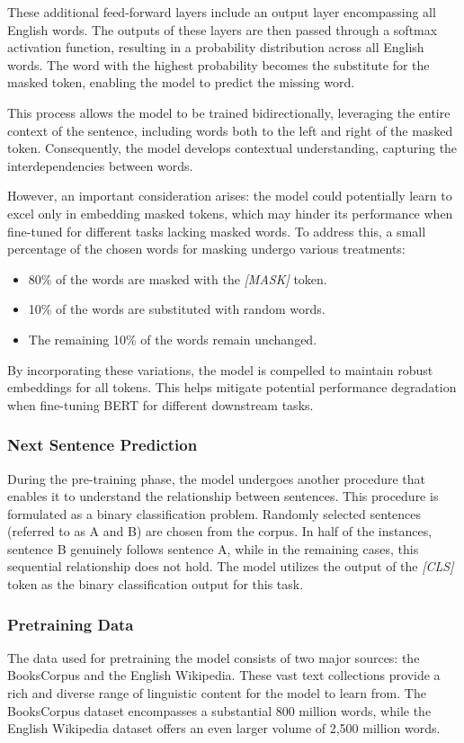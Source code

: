 \documentclass[a4paper,12pt]{report} %
\begin{document}
These additional feed-forward layers include an output layer encompassing all English words. The outputs of these layers are then passed through a softmax activation function, resulting in a probability distribution across all English words. The word with the highest probability becomes the substitute for the masked token, enabling the model to predict the missing word.

This process allows the model to be trained bidirectionally, leveraging the entire context of the sentence, including words both to the left and right of the masked token. Consequently, the model develops contextual understanding, capturing the interdependencies between words.

However, an important consideration arises: the model could potentially learn to excel only in embedding masked tokens, which may hinder its performance when fine-tuned for different tasks lacking masked words. To address this, a small percentage of the chosen words for masking undergo various treatments:

\begin{itemize}
  \item 80\% of the words are masked with the \textit{[MASK]} token.
  \item 10\% of the words are substituted with random words.
  \item The remaining 10\% of the words remain unchanged.
\end{itemize}

By incorporating these variations, the model is compelled to maintain robust embeddings for all tokens. This helps mitigate potential performance degradation when fine-tuning BERT for different downstream tasks.

\subsubsection{Next Sentence Prediction}
During the pre-training phase, the model undergoes another procedure that enables it to understand the relationship between sentences. This procedure is formulated as a binary classification problem. Randomly selected sentences (referred to as A and B) are chosen from the corpus. In half of the instances, sentence B genuinely follows sentence A, while in the remaining cases, this sequential relationship does not hold. The model utilizes the output of the \textit{[CLS]} token as the binary classification output for this task.

\subsubsection{Pretraining Data}
The data used for pretraining the model consists of two major sources: the BooksCorpus and the English Wikipedia. These vast text collections provide a rich and diverse range of linguistic content for the model to learn from. The BooksCorpus dataset encompasses a substantial 800 million words, while the English Wikipedia dataset offers an even larger volume of 2,500 million words. 
\end{document}
